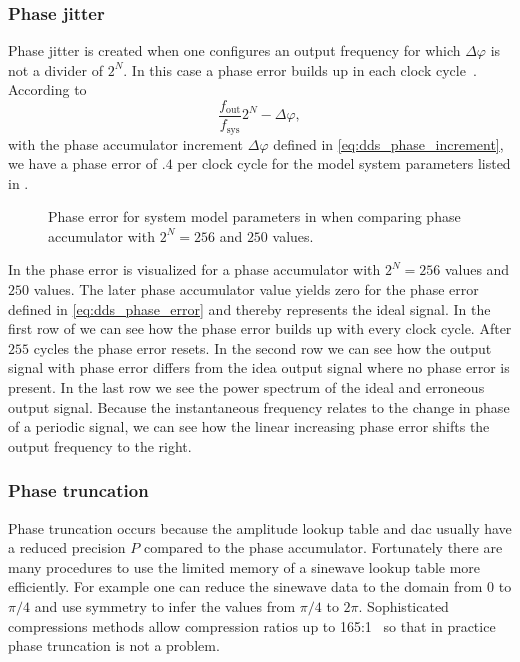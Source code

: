 \subsubsection{Phase jitter}

Phase jitter is created when one configures an output frequency for which
$\Delta\varphi$ is not a divider of $2^N$. In this case a phase error builds
up in each clock cycle~\cite{Vankka2013}. According to
\begin{equation}
  \frac{f_\text{out}}{f_\text{sys}}2^N-\Delta\varphi,
  \label{eq:dds_phase_error}
\end{equation}
with the phase accumulator increment $\Delta\varphi$ defined in
\cref{eq:dds_phase_increment}, we have a phase error of $.4$ per clock cycle
for the model system parameters listed in . 
\begin{figure}[htb]
  \centering
  \begin{adjustbox}{width=\textwidth}
    
  \end{adjustbox}
  \caption{Phase error for system model parameters in
     when comparing phase accumulator with
    $2^N=256$ and $250$ values.
  }\label{fig:dds_phase_error}
\end{figure}
In  the phase error is visualized for a phase
accumulator with $2^N=256$ values and $250$ values. The later phase
accumulator value yields zero for the phase error defined in
\cref{eq:dds_phase_error} and thereby represents the ideal signal. In the
first row of  we can see how the phase error builds
up with every clock cycle. After $255$ cycles the phase error resets. In the
second row we can see how the output signal with phase error differs from the
idea output signal where no phase error is present. In the last row we see the
power spectrum of the ideal and erroneous output signal. Because the
instantaneous frequency relates to the change in phase of a periodic signal,
we can see how the linear increasing phase error shifts the output frequency
to the right.

\subsubsection{Phase truncation}

Phase truncation occurs because the amplitude lookup table and \gls{dac}
usually have a reduced precision $P$ compared to the phase accumulator. 
Fortunately there are many procedures to use the limited memory of a sinewave
lookup table more efficiently. For example one can reduce the sinewave data to
the domain from $0$ to $\pi/4$ and use symmetry to infer the values from
$\pi/4$ to $2\pi$. Sophisticated compressions methods allow compression ratios
up to 165:1~\cite{Cordesses2004} so that in practice phase truncation is not a
problem.

